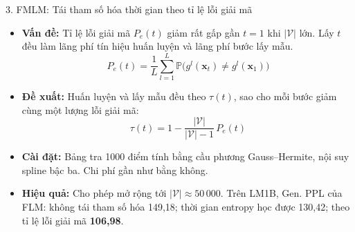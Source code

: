 \begin{frame}{3. FMLM: Tái tham số hóa thời gian theo tỉ lệ lỗi giải mã}
    \begin{itemize}
        \item \textbf{Vấn đề:} Tỉ lệ lỗi giải mã $P_e(t)$ giảm rất gấp gần $t = 1$ khi $|\mathcal{V}|$ lớn. Lấy $t$ đều làm lãng phí tín hiệu huấn luyện và lãng phí bước lấy mẫu.
        $$P_e(t) = \frac{1}{L}\sum_{l=1}^{L} \mathbb{P}\big(g^l(\mathbf{x}_t) \neq g^l(\mathbf{x}_1)\big)$$
        \item \textbf{Đề xuất:} Huấn luyện và lấy mẫu đều theo $\tau(t)$, sao cho mỗi bước giảm cùng một lượng lỗi giải mã:
        $$\tau(t) = 1 - \frac{|\mathcal{V}|}{|\mathcal{V}|-1}\,P_e(t)$$
        \item \textbf{Cài đặt:} Bảng tra 1000 điểm tính bằng cầu phương Gauss--Hermite, nội suy spline bậc ba. Chi phí gần như bằng không.
        \item \textbf{Hiệu quả:} Cho phép mở rộng tới $|\mathcal{V}| \approx 50\,000$. Trên LM1B, Gen. PPL của FLM: không tái tham số hóa 149,18; thời gian entropy học được 130,42; theo tỉ lệ lỗi giải mã \textbf{106,98}.
    \end{itemize}
\end{frame}

